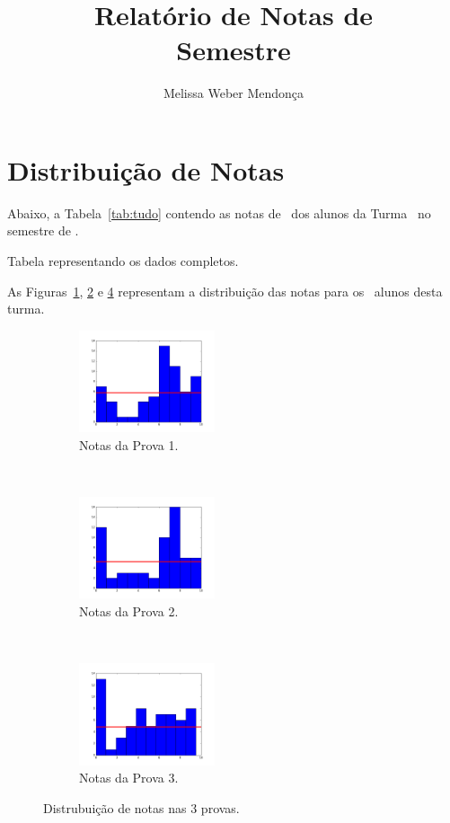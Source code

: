 \documentclass{article}
\title{Relatório de Notas de \disciplina\\Semestre \semestre}
\author{Melissa Weber Mendonça}
\date{}
\begin{document}
\maketitle
\section*{Distribuição de Notas}

Abaixo, a Tabela~\ref{tab:tudo} contendo as notas de \disciplina\ dos alunos da Turma \turma\ no semestre de \semestre.

\begin{table}[h!]
   \begin{center}
      \caption{Tabela representando os dados completos.}
      \label{tab:tudo}
   \end{center}
\end{table}

As Figuras~\ref{fig:prova1}, \ref{fig:prova2} e \ref{fig:prova3} representam a distribuição das notas para os \numerodealunos\ alunos desta turma.

\begin{figure}[ht]
   \centering
   \begin{subfigure}[b]{0.3\textwidth}
      \includegraphics[width=4cm]{prova1.png}
      \caption{Notas da Prova 1.}
      \label{fig:prova1}
   \end{subfigure}
   ~
   \begin{subfigure}[b]{0.3\textwidth}
      \includegraphics[width=4cm]{prova2.png}
      \caption{Notas da Prova 2.}
      \label{fig:prova2}
   \end{subfigure}
   ~
   \begin{subfigure}[b]{0.3\textwidth}
      \includegraphics[width=4cm]{prova3.png}
      \caption{Notas da Prova 3.}
      \label{fig:prova3}
   \end{subfigure}
   \caption{Distrubuição de notas nas 3 provas.}
\end{figure}
\end{document}
